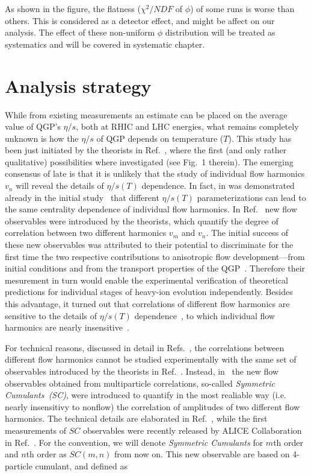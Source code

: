 As shown in the figure, the flatness ($\chi^2/NDF$ of $\phi$) of some runs is worse than others. This is  considered as a detector effect, and might be affect on our analysis. The effect of these non-uniform $\phi$ distribution will be treated as systematics and will be covered in systematic chapter.
 

\clearpage

\section{Analysis strategy}
\label{sec:analysis}


While from existing measurements an estimate can be placed on the average value of QGP's $\eta/s$, both at RHIC and LHC energies, what remains completely unknown is how the $\eta/s$ of QGP depends on temperature ($T$). This study has been just initiated by the theorists in Ref.~\cite{Niemi:2015qia}, where the first (and only rather qualitative) possibilities where investigated (see Fig.~1 therein). The emerging consensus of late is that it is unlikely that the study of individual flow harmonics $v_n$ will reveal the details of $\eta/s(T)$ dependence. In fact, in was demonstrated already in the initial study~\cite{Niemi:2015qia} that different $\eta/s(T)$ parameterizations can lead to the same centrality dependence of individual flow harmonics. In Ref.~\cite{Niemi:2012aj} new flow observables were introduced by the theorists, which quantify the degree of correlation between two different harmonics $v_m$ and $v_n$. The initial success of these new observables was attributed to their potential to discriminate for the first time the two respective contributions to anisotropic flow development---from initial conditions and from the transport properties of the QGP~\cite{Niemi:2012aj}. Therefore their mesurement in turn would enable the experimental verification of theoretical predictions for individual stages of heavy-ion evolution independently. Besides this advantage, it turned out that correlations of different flow harmonics are sensitive to the details of $\eta/s(T)$ dependence~\cite{ALICE:2016kpq}, to which individual flow harmonics are nearly insensitive~\cite{Niemi:2015qia}. 

 For technical reasons, discussed in detail in Refs.~\cite{ALICE:2016kpq,Bilandzic:2013kga}, the correlations between different flow harmonics cannot be studied experimentally with the same set of observables introduced by the theorists in Ref.~\cite{Niemi:2012aj}. Instead, in~\cite{Bilandzic:2013kga} the new flow observables obtained from multiparticle correlations, so-called \textit{Symmetric Cumulants~(SC)}, were introduced to quantify in the most realiable way (i.e. nearly insensitivy to nonflow) the correlation of amplitudes of two different flow harmonics. The technical details are elaborated in Ref.~\cite{Bilandzic:2013kga}, while the first measurements of $SC$ observables were recently released by ALICE Collaboration in Ref.~\cite{ALICE:2016kpq}. For the convention, we will denote \textit{Symmetric Cumulants} for $m$th order and $n$th order as $SC(m,n)$ from now on.  This new observable are based on 4-particle cumulant, and defined as 

